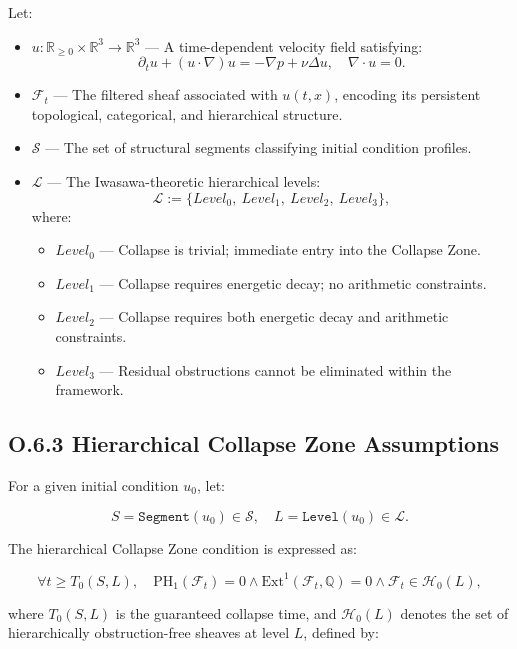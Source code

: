 \documentclass[11pt]{article}
\begin{document}
Let:

\begin{itemize}
  \item \( u : \mathbb{R}_{\geq 0} \times \mathbb{R}^3 \to \mathbb{R}^3 \) — A time-dependent velocity field satisfying:
  \[
  \partial_t u + (u \cdot \nabla)u = -\nabla p + \nu \Delta u,\quad \nabla \cdot u = 0.
  \]
  \item \( \mathcal{F}_t \) — The filtered sheaf associated with \( u(t, x) \), encoding its persistent topological, categorical, and hierarchical structure.
  \item \( \mathcal{S} \) — The set of structural segments classifying initial condition profiles.
  \item \( \mathcal{L} \) — The Iwasawa-theoretic hierarchical levels:
  \[
  \mathcal{L} := \{ Level_0,\ Level_1,\ Level_2,\ Level_3 \},
  \]
  where:
  \begin{itemize}
    \item \( Level_0 \) — Collapse is trivial; immediate entry into the Collapse Zone.
    \item \( Level_1 \) — Collapse requires energetic decay; no arithmetic constraints.
    \item \( Level_2 \) — Collapse requires both energetic decay and arithmetic constraints.
    \item \( Level_3 \) — Residual obstructions cannot be eliminated within the framework.
  \end{itemize}
\end{itemize}

\subsection*{O.6.3 Hierarchical Collapse Zone Assumptions}

For a given initial condition \( u_0 \), let:

\[
S = \texttt{Segment}(u_0) \in \mathcal{S}, \quad L = \texttt{Level}(u_0) \in \mathcal{L}.
\]

The hierarchical Collapse Zone condition is expressed as:

\[
\forall t \geq T_0(S, L),\quad \mathrm{PH}_1(\mathcal{F}_t) = 0 \land \mathrm{Ext}^1(\mathcal{F}_t, \mathbb{Q}) = 0 \land \mathcal{F}_t \in \mathcal{H}_0(L),
\]

where \( T_0(S, L) \) is the guaranteed collapse time, and \( \mathcal{H}_0(L) \) denotes the set of hierarchically obstruction-free sheaves at level \( L \), defined by:
\end{document}
